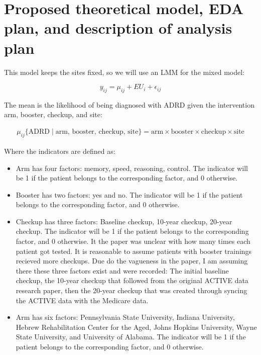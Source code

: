 \documentclass[11pt]{article}
\begin{document}
\section{Proposed theoretical model, EDA plan, and description of analysis plan}
\label{sec:org3b3d6c2}

This model keeps the sites fixed, so we will use an LMM for the mixed model:

\begin{equation}
y_{ij} = \mu_{ij} + EU_i + \epsilon_{ij}
\end{equation}

The mean is the likelihood of being diagnosed with ADRD given the intervention arm, booster, checkup, and site:

\begin{align}
\mu_{ij} \{ \text{ADRD} \mid \text{arm, booster, checkup, site} \} = \text{arm} \times \text{booster} \times \text{checkup} \times \text{site}
\end{align}

Where the indicators are defined as:
\begin{itemize}
\item Arm has four factors: memory, speed, reasoning, control. The indicator will be 1 if the patient belongs to the corresponding factor, and 0 otherwise.
\item Booster has two factors: yes and no. The indicator will be 1 if the patient belongs to the corresponding factor, and 0 otherwise.
\item Checkup has three factors: Baseline checkup, 10-year checkup, 20-year checkup. The indicator will be 1 if the patient belongs to the corresponding factor, and 0 otherwise. It the paper was unclear with how many times each patient got tested. It is reasonable to assume patients with booster trainings recieved more checkups. Due do the vagueness in the paper, I am assuming there these three factors exist and were recorded: The initial baseline checkup, the 10-year checkup that followed from the original ACTIVE data research paper, then the 20-year checkup that was created through syncing the ACTIVE data with the Medicare data.
\item Arm has six factors: Pennsylvania State University, Indiana University, Hebrew Rehabilitation Center for the Aged, Johns Hopkins University, Wayne State University, and University of Alabama. The indicator will be 1 if the patient belongs to the corresponding factor, and 0 otherwise.
\end{itemize}
\end{document}
